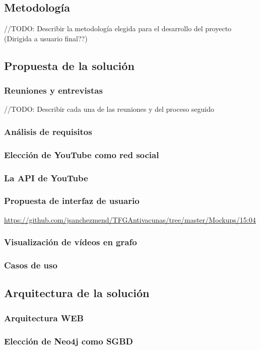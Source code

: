 \documentclass[11pt,a4paper]{article}
\begin{document}
\subsection{Metodología}
//TODO: Describir la metodología elegida para el desarrollo del proyecto (Dirigida a usuario final??)

\subsection{Propuesta de la solución}
\subsubsection{Reuniones y entrevistas}
//TODO: Describir cada una de las reuniones y del proceso seguido
\subsubsection{Análisis de requisitos}
\subsubsection{Elección de YouTube como red social}
\subsubsection{La API de YouTube}
\subsubsection{Propuesta de interfaz de usuario}
\url{https://github.com/jsanchezmend/TFGAntivacunas/tree/master/Mockups/15:04}
\subsubsection{Visualización de vídeos en grafo}
\subsubsection{Casos de uso}

\subsection{Arquitectura de la solución}
\subsubsection{Arquitectura WEB}
\subsubsection{Elección de Neo4j como SGBD}
\end{document}
